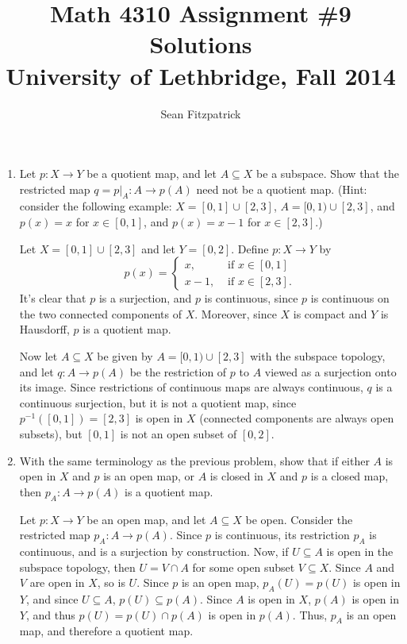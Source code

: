\documentclass[letterpaper,12pt]{article}
\title{Math 4310 Assignment \#9 Solutions\\University of Lethbridge, Fall 2014}
\author{Sean Fitzpatrick}
\begin{document}
 \maketitle

\begin{enumerate}
\item Let $p:X\to Y$ be a quotient map, and let $A\subseteq X$ be a subspace. Show that the restricted map $q=p|_A:A\to p(A)$ need not be a quotient map. (Hint: consider the following example: $X=[0,1]\cup [2,3]$, $A=[0,1)\cup [2,3]$, and $p(x)=x$ for $x\in [0,1]$, and $p(x)=x-1$ for $x\in [2,3]$.)

\bigskip

Let $X=[0,1]\cup [2,3]$ and let $Y=[0,2]$. Define $p:X\to Y$ by
\[
 p(x) = \begin{cases} x, & \text{ if } x\in [0,1]\\
         x-1, & \text{ if } x\in [2,3].
        \end{cases}
\]
It's clear that $p$ is a surjection, and $p$ is continuous, since $p$ is continuous on the two connected components of $X$. Moreover, since $X$ is compact and $Y$ is Hausdorff, $p$ is a quotient map.

Now let $A\subseteq X$ be given by $A=[0,1)\cup [2,3]$ with the subspace topology, and let $q:A\to p(A)$ be the restriction of $p$ to $A$ viewed as a surjection onto its image. Since restrictions of continuous maps are always continuous, $q$ is a continuous surjection, but it is not a quotient map, since $p^{-1}([0,1]) = [2,3]$ is open in $X$ (connected components are always open subsets), but $[0,1]$ is not an open subset of $[0,2]$.

\bigskip

\item With the same terminology as the previous problem, show that if either $A$ is open in $X$ and $p$ is an open map, or $A$ is closed in $X$ and $p$ is a closed map, then $p_A:A\to p(A)$ is a quotient map.

\bigskip

Let $p:X\to Y$ be an open map, and let $A\subseteq X$ be open. Consider the restricted map $p_A:A\to p(A)$. Since $p$ is continuous, its restriction $p_A$ is continuous, and is a surjection by construction. Now, if $U\subseteq A$ is open in the subspace topology, then $U=V\cap A$ for some open subset $V\subseteq X$. Since $A$ and $V$ are open in $X$, so is $U$. Since $p$ is an open map, $p_A(U)=p(U)$ is open in $Y$, and since $U\subseteq A$, $p(U)\subseteq p(A)$. Since $A$ is open in $X$, $p(A)$ is open in $Y$, and thus $p(U) = p(U)\cap p(A)$ is open in $p(A)$. Thus, $p_A$ is an open map, and therefore a quotient map.


\end{enumerate}
\end{document}
